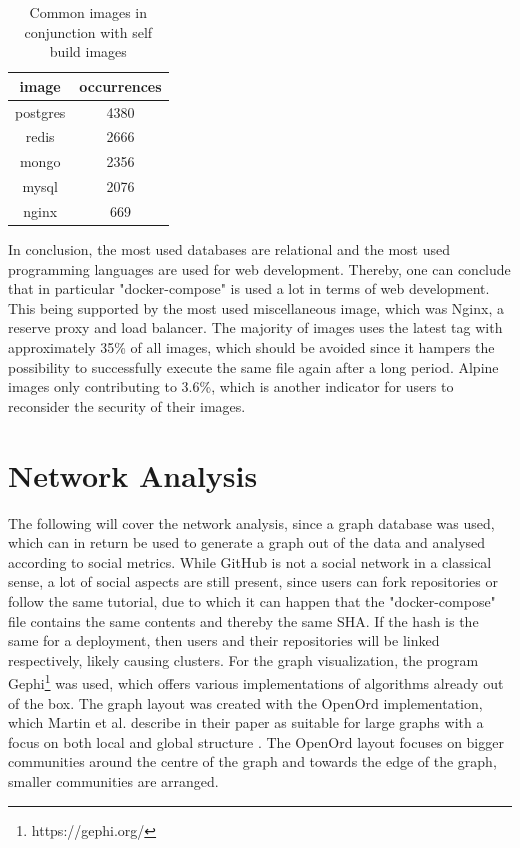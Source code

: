 \begin{table}[]
    \centering
    \begin{tabular}{ |c|c| }
    \hline
    image & occurrences \\
    \hline
         postgres & 4380 \\
         redis & 2666 \\
         mongo & 2356 \\
         mysql & 2076 \\
         nginx & 669 \\
    \hline
    \end{tabular}
    \caption{Common images in conjunction with self build images}
    \label{self_build_commons}
\end{table}

In conclusion, the most used databases are relational and the most used programming languages are used for web development. Thereby, one can conclude that in particular "docker-compose" is used a lot in terms of web development. This being supported by the most used miscellaneous image, which was Nginx, a reserve proxy and load balancer. The majority of images uses the latest tag with approximately 35\% of all images, which should be avoided since it hampers the possibility to successfully execute the same file again after a long period. Alpine images only contributing to 3.6\%, which is another indicator for users to reconsider the security of their images.

\section{Network Analysis}

The following will cover the network analysis, since a graph database was used, which can in return be used to generate a graph out of the data and analysed according to social metrics. While GitHub is not a social network in a classical sense, a lot of social aspects are still present, since users can fork repositories or follow the same tutorial, due to which it can happen that the "docker-compose" file contains the same contents and thereby the same SHA. If the hash is the same for a deployment, then users and their repositories will be linked respectively, likely causing clusters.
For the graph visualization, the program Gephi\footnote{https://gephi.org/} was used, which offers various implementations of algorithms already out of the box. The graph layout was created with the OpenOrd implementation, which Martin et al. describe in their paper as suitable for large graphs with a focus on both local and global structure \cite{openOrd}. The OpenOrd layout focuses on bigger communities around the centre of the graph and towards the edge of the graph, smaller communities are arranged.

